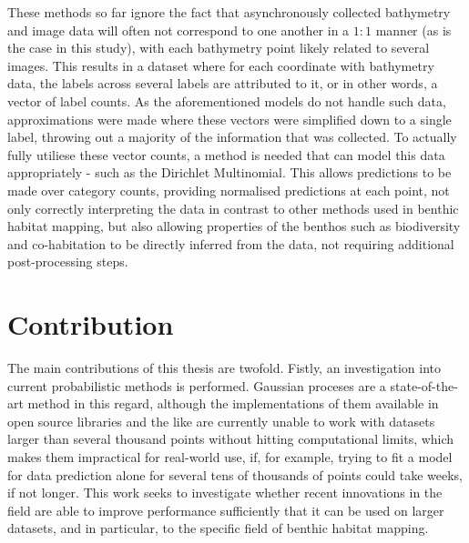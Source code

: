 These methods so far ignore the fact that asynchronously collected bathymetry and image data will often not correspond to one another in a $1:1$ manner (as is the case in this study), with each bathymetry point likely related to several images. This results in a dataset where for each coordinate with bathymetry data, the labels across several labels are attributed to it, or in other words, a vector of label counts. As the aforementioned models do not handle such data, approximations were made where these vectors were simplified down to a single label, throwing out a majority of the information that was collected. To actually fully utiliese these vector counts, a method is needed that can model this data appropriately - such as the Dirichlet Multinomial. This allows predictions to be made over category counts, providing normalised predictions at each point, not only correctly interpreting the data in contrast to other methods used in benthic habitat mapping, but also allowing properties of the benthos such as biodiversity and co-habitation to be directly inferred from the data, not requiring additional post-processing steps.


\section{Contribution}

The main contributions of this thesis are twofold. Fistly, an investigation into current probabilistic methods is performed. Gaussian proceses are a state-of-the-art method in this regard, although the implementations of them available in open source libraries and the like are currently unable to work with datasets larger than several thousand points without hitting computational limits, which makes them impractical for real-world use, if, for example, trying to fit a model for data prediction alone for several tens of thousands of points could take weeks, if not longer. This work seeks to investigate whether recent innovations in the field are able to improve performance sufficiently that it can be used on larger datasets, and in particular, to the specific field of benthic habitat mapping.

